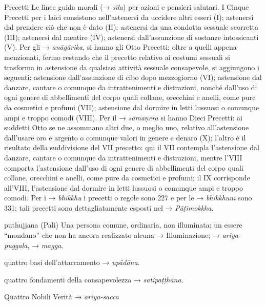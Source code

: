 \begin{glossarydescription}
\item[Precetti] Le linee guida morali (→ \emph{sīla}) per azioni e pensieri
salutari. I Cinque Precetti per i laici consistono nell'astenersi da
uccidere altri esseri (I); astenersi dal prendere ciò che non è dato
(II); astenersi da una condotta sessuale scorretta (III); astenersi dal
mentire (IV); astenersi dall'assunzione di sostanze intossicanti (V).
Per gli → \emph{anāgārika}, si hanno gli Otto Precetti; oltre a quelli
appena menzionati, fermo restando che il precetto relativo ai costumi
sessuali si trasforma in astensione da qualsiasi attività sessuale
consapevole, si aggiungono i seguenti: astensione dall'assunzione di
cibo dopo mezzogiorno (VI); astensione dal danzare, cantare o comunque
da intrattenimenti e distrazioni, nonché dall'uso di ogni genere di
abbellimenti del corpo quali collane, orecchini e anelli, come pure da
cosmetici e profumi (VII); astensione dal dormire in letti lussuosi o
comunque ampi e troppo comodi (VIII). Per il → \emph{sāmaṇera} si hanno
Dieci Precetti: ai suddetti Otto se ne assommano altri due, o meglio
uno, relativo all'astensione dall'usare oro e argento o comunque valori
in genere e denaro (X); l'altro è il risultato della suddivisione del
VII precetto: qui il VII contempla l'astensione dal danzare, cantare o
comunque da intrattenimenti e distrazioni, mentre l'VIII comporta
l'astensione dall'uso di ogni genere di abbellimenti del corpo quali
collane, orecchini e anelli, come pure da cosmetici e profumi; il IX
corrisponde all'VIII, l'astensione dal dormire in letti lussuosi o
comunque ampi e troppo comodi. Per i → \emph{bhikkhu} i precetti o
regole sono 227 e per le → \emph{bhikkhunī} sono 331; tali precetti sono
dettagliatamente esposti nel → \emph{Pāṭimokkha}.

\item[puthujjana] (Pali) Una persona comune, ordinaria, non illuminata; un
essere ``mondano'' che non ha ancora realizzato alcuna → Illuminazione;
→ \emph{ariya-puggala}, → \emph{magga}.


\item[quattro basi dell'attaccamento] → \emph{upādāna}.

\item[quattro fondamenti della consapevolezza] → \emph{satipaṭṭhāna.}

\item[Quattro Nobili Verità] → \emph{ariya-sacca}



\end{glossarydescription}
